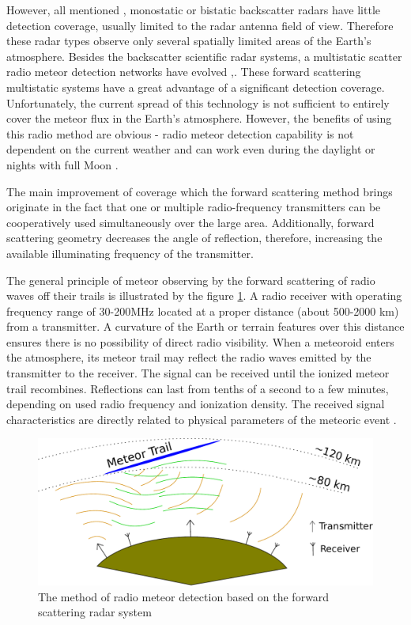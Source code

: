 \documentclass[twoside]{ctuthesis}
\theoremstyle{plain}
\theoremstyle{definition}
\theoremstyle{note}
\begin{document}
However, all mentioned  \cite{skiymet},\cite{CMOR_radar}  monostatic or bistatic backscatter radars have little detection coverage, usually limited to the radar antenna field of view. Therefore these radar types observe only several spatially limited areas of the Earth's atmosphere.
Besides the backscatter scientific radar systems, a multistatic scatter radio meteor detection networks have evolved \cite{BRAMS},\cite{RETRAM}.
These forward scattering multistatic systems have a great advantage of a significant detection coverage. Unfortunately, the current spread of this technology is not sufficient to entirely cover the meteor flux in the Earth's atmosphere.
 However, the benefits of using this radio method are obvious - radio meteor detection capability is not dependent on the current weather and can work even during the daylight or nights with full Moon \cite{daylight_shover}.

The main improvement of coverage which the forward scattering method brings originate in the fact that one or multiple radio-frequency transmitters can be cooperatively used simultaneously over the large area. Additionally, forward scattering geometry decreases the angle of reflection, therefore, increasing the available illuminating frequency of the transmitter. 

The general principle of meteor observing by the forward scattering of radio waves off their trails is illustrated by the figure \ref{fig:forward_scattering}. A radio receiver with operating frequency range of 30-200MHz located at a proper distance (about 500-2000 km) from a transmitter. A curvature of the Earth or terrain features over this distance ensures there is no possibility of direct radio visibility. When a meteoroid enters the atmosphere, its meteor trail may reflect the radio waves emitted by the transmitter to the receiver. The signal can be received until the ionized meteor trail recombines. Reflections can last from tenths of a second to a few minutes, depending on used radio frequency and ionization density. The received signal characteristics are directly related to physical parameters of the meteoric event \cite{forward_scatter}.

\begin{figure}
 \begin{center}
 \includegraphics[width=\linewidth]{./img/Meteor_detection.pdf}
 \caption{The method of radio meteor detection based on the forward scattering radar system}
  \label{fig:forward_scattering} 
 \end{center}
\end{figure}
\end{document}
